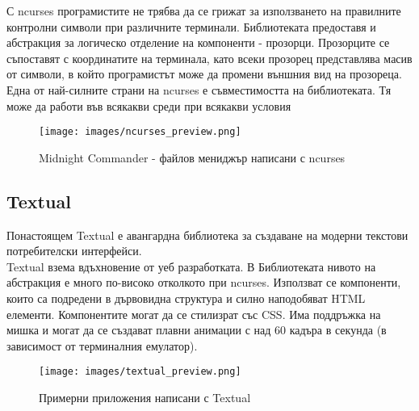                 С ncurses програмистите не трябва да се грижат за използването 
                на правилните контролни символи при различните терминали. 
                Библиотеката предоставя и абстракция за логическо отделение на
                компоненти - прозорци. Прозорците се съпоставят с координатите 
                на терминала, като всеки прозорец представлява масив от 
                символи, в който програмистът може да промени външния вид на 
                прозореца. \\

                Една от най-силните страни на ncurses е съвместимостта на
                библиотеката. Тя може да работи във всякакви среди при 
                всякакви условия \\

                \begin{figure}[H]
                        \centering
                        \texttt{[image: images/ncurses\_preview.png]}
                        \caption{Midnight Commander - файлов мениджър написани 
                        с ncurses}
                        \label{fig:ncurses_preview}
                \end{figure}
                \vspace{10mm}

        \subsection{Textual}
                Понастоящем Textual е авангардна библиотека за създаване на
                модерни текстови потребителски интерфейси. \\

                Textual взема вдъхновение от уеб разработката. В 
                Библиотеката нивото на абстракция е много по-високо отколкото 
                при ncurses. Използват се компоненти, които са подредени в 
                дървовидна структура и силно наподобяват HTML елементи. 
                Компонентите могат да се стилизрат със CSS. Има поддръжка на 
                мишка и могат да се създават плавни анимации с над 60 кадъра в 
                секунда (в зависимост от терминалния емулатор). \\

                \begin{figure}[H]
                        \centering
                        \texttt{[image: images/textual\_preview.png]}
                        \caption{Примерни приложения написани с Textual}
                        \label{fig:textual_preview}
                \end{figure}
                \vspace{10mm}
